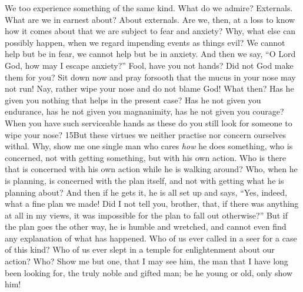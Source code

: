 We too experience something of the same kind. What do we admire? Externals. What are we in earnest about? About externals. Are we, then, at a loss to know how it comes about that we are subject to fear and anxiety? Why, what else can possibly happen, when we regard impending events as things evil? We cannot help but be in fear, we cannot help but be in anxiety. And then we say, ``O Lord God, how may I escape anxiety?'' Fool, have you not hands? Did not God make them for you? Sit down now and pray forsooth that the mucus in your nose may not run! Nay, rather wipe your nose and do not blame God! What then? Has he given you nothing that helps in the present case? Has he not given you endurance, has he not given you magnanimity, has he not given you courage? When you have such serviceable hands as these do you still look for someone to wipe your nose? 15But these virtues we neither practise nor concern ourselves withal. Why, show me one single man who cares \emph{how} he does something, who is concerned, not with getting something, but with his own action. Who is there that is concerned with his own action while he is walking around? Who, when he is planning, is concerned with the plan itself, and not with getting what he is planning about? And then if he gets it, he is all set up and says, ``Yes, indeed, what a fine plan we made! Did I not tell you, brother, that, if there was anything at all in my views, it was impossible for the plan to fall out otherwise?'' But if the plan goes the other way, he is humble and wretched, and cannot even find any explanation of what has happened. Who of us ever called in a seer for a case of this kind? Who of us ever slept in a temple for enlightenment about our action? Who? Show me but one, that I may see him, the man that I have long been looking for, the truly noble and gifted man; be he young or old, only show him!

